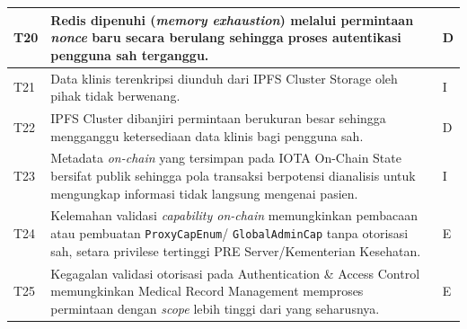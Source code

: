 \begin{xltabular}{\textwidth}{|>{\centering\arraybackslash}p{0.8cm}|X|>{\centering\arraybackslash}p{1.8cm}|}
    T20 & Redis dipenuhi (\textit{memory exhaustion}) melalui permintaan \textit{nonce} baru secara berulang sehingga proses autentikasi pengguna sah terganggu. & D \\
    \hline

    T21 & Data klinis terenkripsi diunduh dari IPFS Cluster Storage oleh pihak tidak berwenang. & I \\
    \hline

    T22 & IPFS Cluster dibanjiri permintaan berukuran besar sehingga mengganggu ketersediaan data klinis bagi pengguna sah. & D \\
    \hline

    T23 & Metadata \textit{on-chain} yang tersimpan pada IOTA On-Chain State bersifat publik sehingga pola transaksi berpotensi dianalisis untuk mengungkap informasi tidak langsung mengenai pasien. & I \\
    \hline

    T24 & Kelemahan validasi \textit{capability on-chain} memungkinkan pembacaan atau pembuatan \texttt{ProxyCapEnum}/ \texttt{GlobalAdminCap} tanpa otorisasi sah, setara privilese tertinggi PRE Server/Kementerian Kesehatan. & E \\
    \hline

    T25 & Kegagalan validasi otorisasi pada Authentication \& Access Control memungkinkan Medical Record Management memproses permintaan dengan \textit{scope} lebih tinggi dari yang seharusnya. & E \\
    \hline

\end{xltabular}
